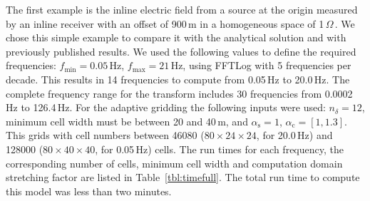 \documentclass[extra, camera,%
    final,       %
]{gji}
\newcommand{\mr}[1]{\mathrm{#1}}
\newcommand{\ohmm}{\ensuremath{\Omega\,}\text{m}\xspace}
\begin{document}
The first example is the inline electric field from a source at the origin
measured by an inline receiver with an offset of 900\,m in a homogeneous space
of 1\,\ohmm. We chose this simple example to compare it with the analytical
solution and with previously published results. We used the following values to
define the required frequencies: $f_\mr{min}=0.05\,$Hz, $f_\mr{max}=21\,$Hz,
using FFTLog with 5 frequencies per decade. This results in 14 frequencies to
compute from 0.05\,Hz to 20.0\,Hz. The complete frequency range for the
transform
includes 30 frequencies from 0.0002\,Hz to 126.4\,Hz. For the adaptive gridding
the following inputs were used: $n_\delta=12$, minimum cell width must be
between 20 and 40\,m, and $\alpha_\mr{s}=1$, $\alpha_\mr{c}=[1,1.3]$. This
 grids with cell numbers between \num{46080}
($80\times24\times24$, for 20.0\,Hz) and \num{128000} ($80\times40\times40$,
for 0.05\,Hz) cells. The run times for each frequency, the corresponding number
of cells, minimum cell width\added{,} and computation domain stretching factor
are listed in Table~\ref{tbl:timefull}. The total run time to compute this
model was less than two minutes.
%
\end{document}

